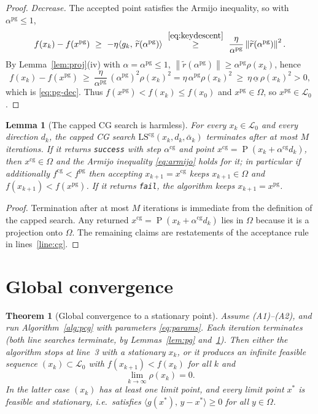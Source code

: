 \documentclass[12pt]{article}
\newtheorem{theorem}{Theorem}
\newtheorem{lemma}{Lemma}
\DeclareMathOperator{\proj}{P}
\newcommand{\norm}[1]{\left\lVert #1 \right\rVert}
\newcommand{\inner}[2]{\langle #1,\, #2\rangle}
\begin{document}
\begin{proof}
\emph{Decrease.} The accepted point satisfies the Armijo inequality, so with
$\alpha^{\mathrm{pg}}\le1$,
\[
f(x_k)-f(x^{\mathrm{pg}})\ \ge\
-\eta\inner{g_k}{\widetilde r(\alpha^{\mathrm{pg}})}
\ \overset{\eqref{eq:keydescent}}{\ge}\
\frac{\eta}{\alpha^{\mathrm{pg}}}\norm{\widetilde r(\alpha^{\mathrm{pg}})}^2 .
\]
By Lemma~\ref{lem:proj}(iv) with $\alpha=\alpha^{\mathrm{pg}}\le1$,
$\norm{\widetilde r(\alpha^{\mathrm{pg}})}\ge\alpha^{\mathrm{pg}}\rho(x_k)$, hence
\[
f(x_k)-f(x^{\mathrm{pg}})\ \ge\
\frac{\eta}{\alpha^{\mathrm{pg}}}\,(\alpha^{\mathrm{pg}})^2\rho(x_k)^2
=\eta\,\alpha^{\mathrm{pg}}\rho(x_k)^2\ \ge\ \eta\,\underline\alpha\,\rho(x_k)^2>0,
\]
which is \eqref{eq:pg-dec}. Thus $f(x^{\mathrm{pg}})<f(x_k)\le f(x_0)$ and
$x^{\mathrm{pg}}\in\Omega$, so $x^{\mathrm{pg}}\in\mathcal L_0$.
\end{proof}

\begin{lemma}[The capped CG search is harmless]\label{lem:cg}
For every $x_k\in\mathcal L_0$ and every direction $d_k$, the capped CG search
$\mathrm{LS}^{\mathrm{cg}}(x_k,d_k,\bar\alpha_k)$ terminates after at most $M$
iterations. If it returns \texttt{success} with step $\alpha^{\mathrm{cg}}$ and
point $x^{\mathrm{cg}}=\proj(x_k+\alpha^{\mathrm{cg}}d_k)$, then
$x^{\mathrm{cg}}\in\Omega$ and the Armijo inequality
\eqref{eq:armijo} holds for it; in particular if additionally
$f^{\mathrm{cg}}<f^{\mathrm{pg}}$ then accepting $x_{k+1}=x^{\mathrm{cg}}$ keeps
$x_{k+1}\in\Omega$ and $f(x_{k+1})<f(x^{\mathrm{pg}})$. If it returns
\texttt{fail}, the algorithm keeps $x_{k+1}=x^{\mathrm{pg}}$.
\end{lemma}

\begin{proof}
Termination after at most $M$ iterations is immediate from the definition of the
capped search. Any returned $x^{\mathrm{cg}}=\proj(x_k+\alpha^{\mathrm{cg}}d_k)$
lies in $\Omega$ because it is a projection onto $\Omega$. The remaining claims
are restatements of the acceptance rule in lines~\ref{line:cg}.
\end{proof}

\section{Global convergence}

\begin{theorem}[Global convergence to a stationary point]\label{thm:main}
Assume (A1)--(A2), and run Algorithm~\ref{alg:pcg} with
parameters \eqref{eq:params}. Each iteration terminates (both line searches
terminate, by Lemmas~\ref{lem:pg} and~\ref{lem:cg}). Then either the algorithm
stops at line~3 with a stationary $x_k$, or it produces an infinite feasible
sequence $(x_k)\subset\mathcal L_0$ with $f(x_{k+1})<f(x_k)$ for all $k$ and
\begin{equation}\label{eq:rho0}
\lim_{k\to\infty}\rho(x_k)=0 .
\end{equation}
In the latter case $(x_k)$ has at least one limit point, and \emph{every} limit
point $x^*$ is feasible and stationary, i.e.\ satisfies
$\inner{g(x^*)}{y-x^*}\ge0$ for all $y\in\Omega$.
\end{theorem}
\end{document}

